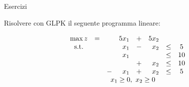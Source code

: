 \documentclass{beamer}
\begin{document}
\generatitolo

\def\rombo{$$
\begin{array}{cccrcrcc}
	\max z	&=	& 	&5 x_{1}	&+&5 x_{2}\\
	\mbox{s.t.}	&	& & x_{1}	&-& x_{2}	&\leq	& 5\\
				&	& & x_{1}	& &     	&\leq	&10\\
				&	& &			&+& x_{2}	&\leq	&10\\
				&	&-& x_{1}	&+& x_{2}	&\leq	& 5\\
	&	&\multicolumn{4}{c}{x_{1} \geq 0,\ x_{2}\geq 0}
\end{array}
$$}

\begin{frame}%
{Esercizi}

Risolvere con GLPK il seguente programma lineare:

\begin{enumerate}
{\footnotesize \item \rombo}
\end{enumerate}

\end{frame}
\end{document}
